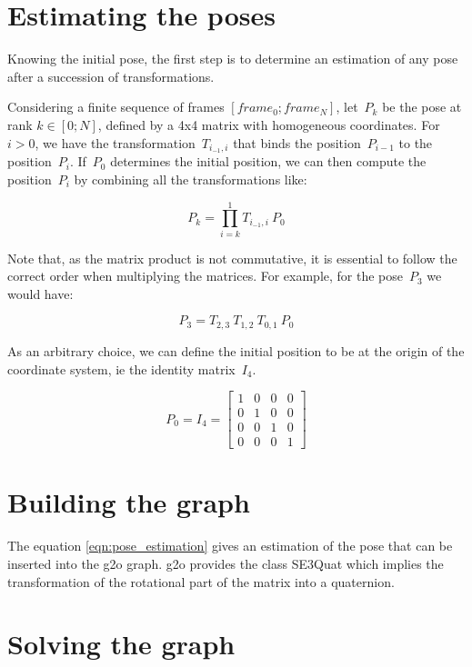 \section{Estimating the poses}

Knowing the initial pose, the first step is to determine an estimation of any pose after a succession of transformations.

Considering a finite sequence of frames $[frame_0 ; frame_N]$, let~$P_k$ be the pose at rank $k \in [0;N]$, defined by a 4x4 matrix with homogeneous coordinates. For~$i>0$, we have the transformation~$T_{i_{-1},i}$ that binds the position~$P_{i-1}$ to the position~$P_i$. If~$P_0$ determines the initial position, we can then compute the position~$P_i$  by combining all the transformations like:

\begin{equation}
P_k = \prod_{i=k}^1{T_{i_{-1},i}} \: P_0
\label{eqn:pose_estimation}
\end{equation}

Note that, as the matrix product is not commutative, it is essential to follow the correct order when multiplying the matrices. For example, for the pose~$P_3$ we would have:

\[
P_3 = T_{2,3} \: T_{1,2} \: T_{0,1} \: P_0
\]

As an arbitrary choice, we can define the initial position to be at the origin of the coordinate system, ie the identity matrix~$I_4$.

\[
P_0 = I_4 = \left[ \begin{array}{cccc}
1 & 0 & 0 & 0 \\
0 & 1 & 0 & 0 \\
0 & 0 & 1 & 0 \\
0 & 0 & 0 & 1 \end{array} \right] 
\]

\section{Building the graph}

The equation \ref{eqn:pose_estimation} gives an estimation of the pose that can be inserted into the g2o graph.
g2o provides the class SE3Quat which implies the transformation of the rotational part of the matrix into a quaternion.

\section{Solving the graph}

